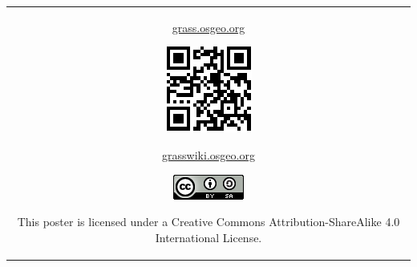 \documentclass[25pt, margin=0mm, innermargin=15mm, blockverticalspace=15mm, colspace=15mm, subcolspace=8mm]{tikzposter}
\begin{document}
\begin{columns}
{\begin{center}
\begin{tabular}{c}
\begin{minipage}{0.15\linewidth}
\small {\url{grass.osgeo.org}}
\end{minipage}

\begin{minipage}{\qrcodesize}
\includegraphics[width=\textwidth]{./images/grass_qr.pdf}
\end{minipage}

\begin{minipage}{0.2\linewidth}
\small {\url{grasswiki.osgeo.org}}
\end{minipage}

\begin{minipage}{0.1\linewidth}
\href{http://creativecommons.org/licenses/by-sa/4.0/}{\includegraphics[width=\textwidth]{ccbysa}}
\end{minipage}

\begin{minipage}{0.35\linewidth}
\small This poster is licensed under a Creative Commons Attribution-ShareAlike 4.0 International License.
\end{minipage}

\end{tabular}
\end{center}

}

\end{columns}
\end{document}
